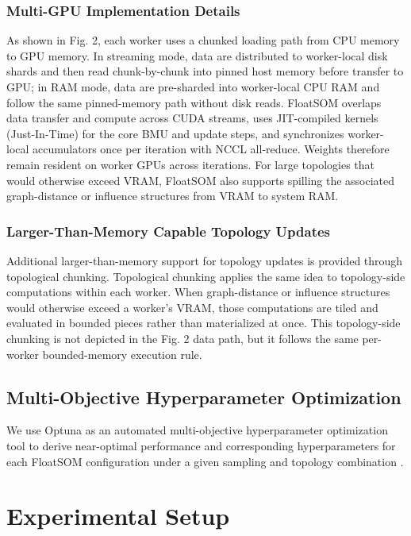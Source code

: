 \documentclass[11pt]{article}
\begin{document}
\subsubsection{Multi-GPU Implementation Details}

As shown in Fig. 2, each worker uses a chunked loading path from CPU memory to GPU memory. In streaming mode, data are distributed to worker-local disk shards and then read chunk-by-chunk into pinned host memory before transfer to GPU; in RAM mode, data are pre-sharded into worker-local CPU RAM and follow the same pinned-memory path without disk reads. FloatSOM overlaps data transfer and compute across CUDA streams, uses JIT-compiled kernels (Just-In-Time) for the core BMU and update steps, and synchronizes worker-local accumulators once per iteration with NCCL all-reduce. Weights therefore remain resident on worker GPUs across iterations. For large topologies that would otherwise exceed VRAM, FloatSOM also supports spilling the associated graph-distance or influence structures from VRAM to system RAM.

\subsubsection{Larger-Than-Memory Capable Topology Updates}

Additional larger-than-memory support for topology updates is provided through topological chunking. Topological chunking applies the same idea to topology-side computations within each worker. When graph-distance or influence structures would otherwise exceed a worker's VRAM, those computations are tiled and evaluated in bounded pieces rather than materialized at once. This topology-side chunking is not depicted in the Fig. 2 data path, but it follows the same per-worker bounded-memory execution rule.

\subsection{Multi-Objective Hyperparameter Optimization}

We use Optuna as an automated multi-objective hyperparameter optimization tool to derive near-optimal performance and corresponding hyperparameters for each FloatSOM configuration under a given sampling and topology combination \citep{akibaOptunaNextgenerationHyperparameter2019}.

\section{Experimental Setup}
\end{document}
